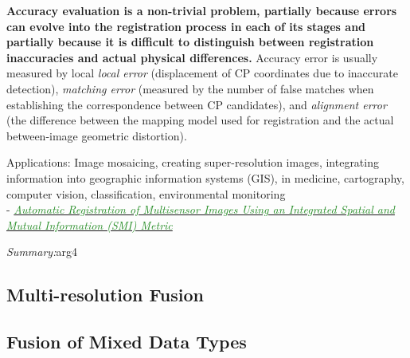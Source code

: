 \documentclass[]{article}
\newcommand{\paperentry}[4]{
            \hangindent=1cm
            \cite{#1} - \href{run:../References/#3}{\textcolor{ForestGreen}{\textit{#2}}}
            
            \noindent            
            \begin{minipage}[t]{0.1\linewidth}\hfill\end{minipage}
            \begin{minipage}[t]{0.8\linewidth}\textcolor{NavyBlue}{{\textit{Summary:}}}#4\end{minipage}
            \vspace{.25cm}
          }
\begin{document}
		\noindent
		\textbf{Accuracy evaluation is a non-trivial problem, partially because errors can evolve into the registration process in each of its stages and partially because it is difficult to distinguish between registration inaccuracies and actual physical differences.}  Accuracy error is usually measured by local \textit{local error} (displacement of CP coordinates due to inaccurate detection), \textit{matching error} (measured by the number of false matches when establishing the correspondence between CP candidates), and \textit{alignment error} (the difference between the mapping model used for registration and the actual between-image geometric distortion).
		
		\noindent
		Applications: Image mosaicing, creating super-resolution images, integrating information into geographic information systems (GIS), in medicine, cartography, computer vision, classification, environmental monitoring \\
		
		\paperentry{Liang2014ImageRegistrationMutualInformation}
		{Automatic Registration of Multisensor Images Using an Integrated Spatial and Mutual Information (SMI) Metric}
		{Fusion/Liang2014ImageRegistrationMutualInformation.pdf}
		{arg4}
		
	
%	
%	
%	
		
	\subsection{Multi-resolution Fusion}
	
	\subsection{Fusion of Mixed Data Types}
		
\end{document}
